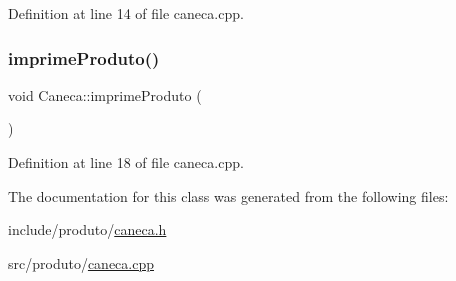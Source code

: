 Definition at line 14 of file caneca.\+cpp.

\mbox{\label{class_caneca_adc870e460fa3e692c5da9a92a6fec531}} 
\subsubsection{\texorpdfstring{imprime\+Produto()}{imprimeProduto()}}
{\footnotesize\ttfamily void Caneca\+::imprime\+Produto (\begin{DoxyParamCaption}{ }\end{DoxyParamCaption})}



Definition at line 18 of file caneca.\+cpp.



The documentation for this class was generated from the following files\+:\begin{DoxyCompactItemize}
\item 
include/produto/\hyperlink{caneca_8h}{caneca.\+h}\item 
src/produto/\hyperlink{caneca_8cpp}{caneca.\+cpp}\end{DoxyCompactItemize}
